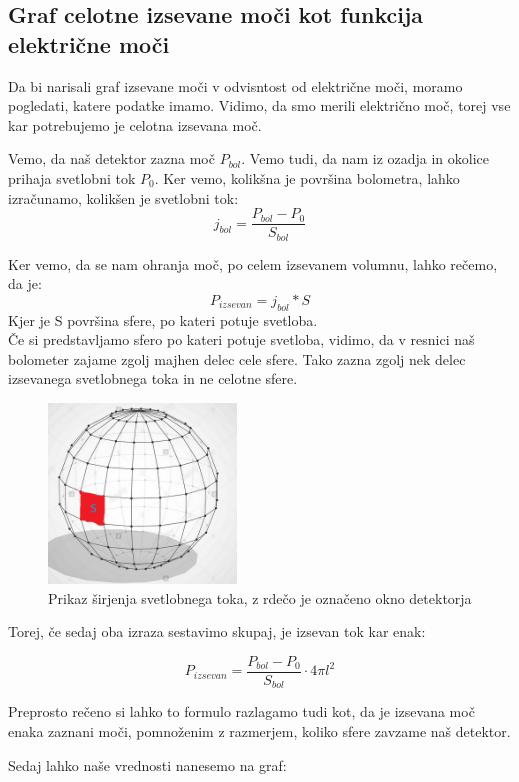 \documentclass[11pt, a4paper]{article}
\theoremstyle{definition}
\theoremstyle{example}
\theoremstyle{izrek}
\begin{document}
\subsection{Graf celotne izsevane moči kot funkcija električne moči}
Da bi narisali graf izsevane moči v odvisntost od električne moči, moramo pogledati, katere podatke imamo. Vidimo, da smo merili električno moč, torej vse kar potrebujemo je celotna izsevana moč.

Vemo, da naš detektor zazna moč $P_{bol}$. Vemo tudi, da nam iz ozadja in okolice prihaja svetlobni tok $P_0$. Ker vemo, kolikšna je površina bolometra, lahko izračunamo, kolikšen je svetlobni tok:
$$j_{bol}=\frac{P_{bol}-P_0}{S_{bol}}$$


Ker vemo, da se nam ohranja moč, po celem izsevanem volumnu, lahko rečemo, da je:
$$P_{izsevan}=j_{bol}*S$$
Kjer je S površina sfere, po kateri potuje svetloba.\\

Če si predstavljamo sfero po kateri potuje svetloba, vidimo, da v resnici naš bolometer zajame zgolj majhen delec cele sfere. Tako zazna zgolj nek delec izsevanega svetlobnega toka in ne celotne sfere. 
\begin{figure}[H]
	\centering
    \includegraphics[width=5cm]{Krogla.png}
    \caption{Prikaz širjenja svetlobnega toka, z rdečo je označeno okno detektorja}
\end{figure}

\pagebreak
Torej, če sedaj oba izraza sestavimo skupaj, je izsevan tok kar enak:

$$P_{izsevan}=\frac{P_{bol}-P_0}{S_{bol}}\cdot 4\pi l^2$$

Preprosto rečeno si lahko to formulo razlagamo tudi kot, da je izsevana moč enaka zaznani moči, pomnoženim z razmerjem, koliko sfere zavzame naš detektor.

Sedaj lahko naše vrednosti nanesemo na graf:
\end{document}
